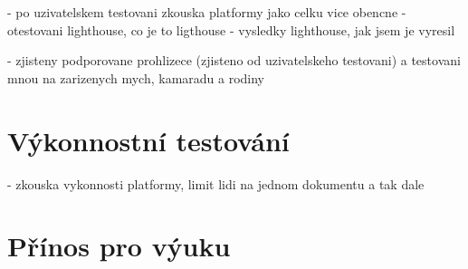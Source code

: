 - po uzivatelskem testovani zkouska platformy jako celku vice obencne
- otestovani lighthouse, co je to ligthouse
- vysledky lighthouse, jak jsem je vyresil

- zjisteny podporovane prohlizece (zjisteno od uzivatelskeho testovani) a testovani mnou na zarizenych mych, kamaradu a rodiny

\section{Výkonnostní testování}

- zkouska vykonnosti platformy, limit lidi na jednom dokumentu a tak dale

\section{Přínos pro výuku}


